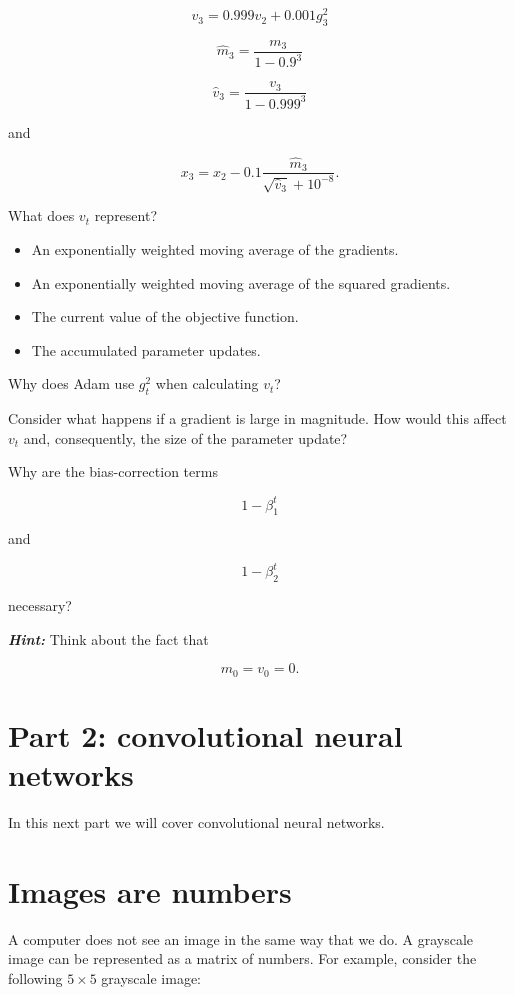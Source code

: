\documentclass{course_sheet}
\begin{document}
\[
v_3 = 0.999v_2+0.001g_3^2
\]

\[
\hat m_3=\frac{m_3}{1-0.9^3}
\]

\[
\hat v_3=\frac{v_3}{1-0.999^3}
\]

and

\[
x_3 =
x_2 -
0.1
\frac{\hat m_3}
{\sqrt{\hat v_3}+10^{-8}}.
\]

What does $v_t$ represent?

\begin{itemize}
\item
[ ] An exponentially weighted moving average of the gradients.

\item
[ ] An exponentially weighted moving average of the squared gradients.

\item
[ ] The current value of the objective function.

\item
[ ] The accumulated parameter updates.

\end{itemize}

Why does Adam use $g_t^2$ when calculating $v_t$?

Consider what happens if a gradient is large in magnitude. How would this affect $v_t$ and, consequently, the size of the parameter update?

Why are the bias-correction terms

\[
1-\beta_1^t
\]

and

\[
1-\beta_2^t
\]

necessary?

\textbf{\textit{Hint:}} Think about the fact that

\[
m_0=v_0=0.
\]

\section*{Part 2: convolutional neural networks}

In this next part we will cover convolutional neural networks. 

\section*{Images are numbers }

A computer does not see an image in the same way that we do. A grayscale image can be represented as a matrix of numbers. For example, consider the following $5 \times 5$ grayscale image:
\end{document}
